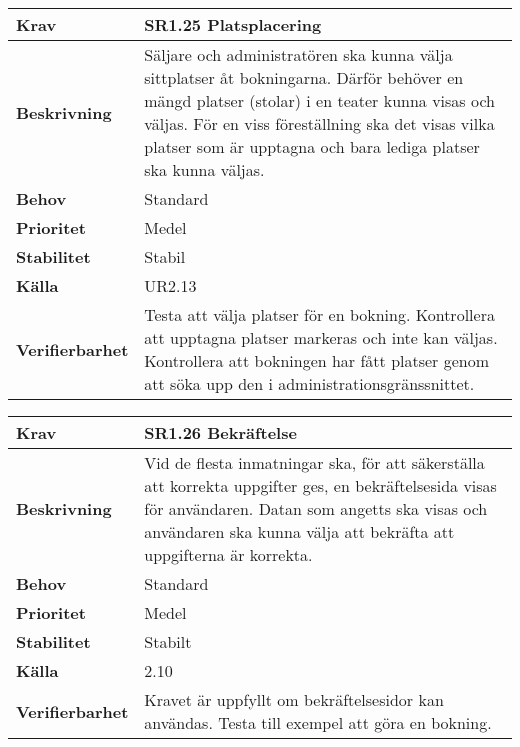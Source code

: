 \documentclass[a4paper, twoside, 11pt, titlepage]{article}
\begin{document}
	\begin{tabular} { p{2.6cm} p{12.5cm} }
		\hline
		\sffamily\textbf{Krav} & \sffamily\textbf{SR1.25 Platsplacering } \\
		\hline
		\sffamily\textbf{Beskrivning} & Säljare och administratören ska kunna välja sittplatser åt bokningarna. Därför behöver en mängd platser (stolar) i en teater kunna visas och väljas. För en viss föreställning ska det visas vilka platser som är upptagna och bara lediga platser ska kunna väljas.  \\
		\hline
		\sffamily\textbf{Behov} & Standard  \\
		\hline
		\sffamily\textbf{Prioritet} & Medel  \\
		\hline
		\sffamily\textbf{Stabilitet} & Stabil  \\
		\hline
		\sffamily\textbf{Källa} & UR2.13  \\
		\hline
		\sffamily\textbf{Verifierbarhet} & Testa att välja platser för en bokning. Kontrollera att upptagna platser markeras och inte kan väljas. Kontrollera att bokningen har fått platser genom att söka upp den i administrationsgränssnittet.  \\
		\hline
	\end{tabular}
	\vspace{6mm}

	\begin{tabular} { p{2.6cm} p{12.5cm} }
		\hline
		\sffamily\textbf{Krav} & \sffamily\textbf{SR1.26 Bekräftelse } \\
		\hline
		\sffamily\textbf{Beskrivning} & Vid de flesta inmatningar ska, för att säkerställa att korrekta uppgifter ges, en bekräftelsesida visas för användaren. Datan som angetts ska visas och användaren ska kunna välja att bekräfta att uppgifterna är korrekta.  \\
		\hline
		\sffamily\textbf{Behov} & Standard  \\
		\hline
		\sffamily\textbf{Prioritet} & Medel  \\
		\hline
		\sffamily\textbf{Stabilitet} & Stabilt  \\
		\hline
		\sffamily\textbf{Källa} & 2.10  \\
		\hline
		\sffamily\textbf{Verifierbarhet} & Kravet är uppfyllt om bekräftelsesidor kan användas. Testa till exempel att göra en bokning.  \\
		\hline
	\end{tabular}
	\vspace{6mm}
\end{document}

